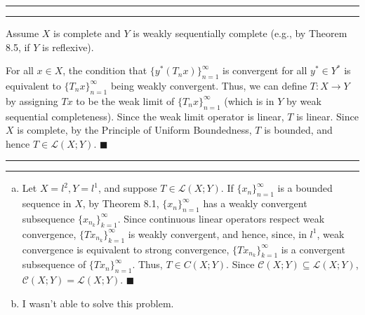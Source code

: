\documentclass[11pt]{article}
\newcounter{questionCounter}
\newcounter{partCounter}[questionCounter]
\newenvironment{question}[2][\arabic{questionCounter}]{%
    \setcounter{partCounter}{0}%
    \vspace{.25in} \hrule \vspace{0.5em}%
        \noindent{\bf #2}%
    \vspace{0.8em} \hrule \vspace{.10in}%
    \addtocounter{questionCounter}{1}%
}{}
\renewcommand{\qed}{\quad $\blacksquare$}
\newcommand{\C}{\mathcal{C}} %
\renewcommand{\L}{\mathcal{L}} %
\begin{document}
\begin{question}{Problem 4}
Assume $X$ is complete and $Y$ is weakly sequentially complete (e.g., by
Theorem 8.5, if $Y$ is reflexive).

For all $x \in X$, the
condition that $\{y^*(T_nx)\}_{n = 1}^\infty$ is convergent for all
$y^* \in Y^*$ is equivalent to $\{T_nx\}_{n = 1}^\infty$ being weakly
convergent.
Thus, we can define $T : X \to Y$ by assigning $Tx$ to be the weak limit of
$\{T_nx\}_{n = 1}^\infty$ (which is in $Y$ by weak sequential completeness).
Since the weak limit operator is linear, $T$ is linear. Since $X$ is complete,
by the Principle of Uniform Boundedness, $T$ is bounded, and hence
$T \in \L(X;Y)$. \qed
\end{question}

\newpage
\begin{question}{Problem 5}
\vspace{-0.2in}
\begin{enumerate}[(a)]
\item Let $X = l^2, Y = l^1$, and suppose $T \in \L(X;Y)$. If
$\{x_n\}_{n = 1}^\infty$ is a bounded sequence in $X$, by Theorem
8.1, $\{x_n\}_{n = 1}^\infty$ has a weakly convergent subsequence
$\{x_{n_k}\}_{k = 1}^\infty$. Since continuous linear operators respect
weak convergence, $\{Tx_{n_k}\}_{k = 1}^\infty$ is weakly convergent, and
hence, since, in $l^1$, weak convergence is equivalent to strong convergence,
$\{Tx_{n_k}\}_{k = 1}^\infty$ is a convergent subsequence of
$\{Tx_n\}_{n = 1}^\infty$. Thus, $T \in C(X;Y)$. Since
$\C(X;Y) \subseteq \L(X;Y)$, $\C(X;Y) = \L(X;Y)$. \qed

\item I wasn't able to solve this problem.
\end{enumerate}
\vspace{-0.2in}
\end{question}
\end{document}
